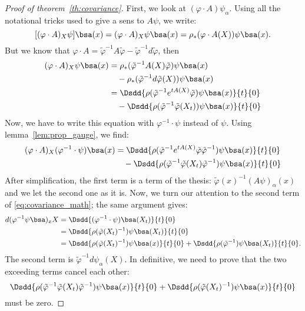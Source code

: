 \begin{proof}[Proof of theorem~\ref{th:covariance}]
	First, we look at $(\varphi\cdot A)\psi_{\alpha}$. Using all the notational tricks used to give a sens to $A\psi$, we write:
	\[
		[(\varphi\cdot A)_X\psi]\bsa(x)=(\varphi\cdot A)_X\psi\bsa(x)=\rho_*(\varphi\cdot A(X))\psi\bsa(x).
	\]
	But we know that $\varphi\cdot A=\tilde{\varphi}^{-1} A\tilde{\varphi}-\tilde{\varphi}^{-1} d\tilde{\varphi}$, then
	\begin{equation}\label{eq:en_deux}
		\begin{split}
			(\varphi\cdot A)_X\psi\bsa(x)
			&=\rho_*(\tilde{\varphi}^{-1} A(X)\tilde{\varphi})\psi\bsa(x)\\
			&\quad-\rho_*(\tilde{\varphi}^{-1} d\tilde{\varphi}(X))\psi\bsa(x)\\
			&=\Dsdd{ \rho(\tilde{\varphi}^{-1} e^{tA(X)}\tilde{\varphi})\psi\bsa(x)}{t}{0}\\
			&\quad-\Dsdd{ \rho(\tilde{\varphi}^{-1}\tilde{\varphi}(X_t))\psi\bsa(x) }{t}{0}
		\end{split}
	\end{equation}
	Now, we have to write this equation with $\varphi^{-1}\cdot\psi$ instead of $\psi$. Using lemma~\ref{lem:prop_gauge}, we find:
	\begin{equation}
		\begin{split}
			(\varphi\cdot A)_X(\varphi^{-1}\cdot\psi)\bsa(x)
			&=\Dsdd{ \rho(\tilde{\varphi}^{-1} e^{tA(X)}\tilde{\varphi}\tilde{\varphi}^{-1})\psi\bsa(x)}{t}{0}\\
			&\quad-\Dsdd{ \rho(\tilde{\varphi}^{-1}\tilde{\varphi}(X_t)\tilde{\varphi}^{-1})\psi\bsa(x) }{t}{0}
		\end{split}
	\end{equation}
	After simplification, the first term is a term of the thesis: $\tilde{\varphi}(x)^{-1}(A\psi)_{\alpha}(x)$ and we let the second one as it is. Now, we turn our attention to the second term of \eqref{eq:covariance_math}; the same argument gives:
	\begin{equation}
		\begin{split}
			d(\varphi^{-1}\psi\bsa)_xX
			&=\Dsdd{(\varphi^{-1}\cdot\psi)\bsa(X_t)}{t}{0}\\
			&=\Dsdd{\rho(\tilde{\varphi}(X_t)^{-1})\psi\bsa(X_t)}{t}{0}\\
			&=\Dsdd{\rho(\tilde{\varphi}(X_t)^{-1})\psi\bsa(x)}{t}{0}
			+\Dsdd{\rho(\tilde{\varphi}^{-1})\psi\bsa(X_t)}{t}{0}.
		\end{split}
	\end{equation}
	The second term is $\tilde{\varphi}^{-1} d\psi_{\alpha}(X)$. In definitive, we need to prove that the two exceeding terms cancel each other:
	\begin{equation}\label{eq:le_zero}
		\Dsdd{\rho(\tilde{\varphi}^{-1}\tilde{\varphi}(X_t)\tilde{\varphi}^{-1})\psi\bsa(x)}{t}{0}
		+\Dsdd{\rho(\tilde{\varphi}(X_t)^{-1})\psi\bsa(x)}{t}{0}
	\end{equation}
	must be zero.


\end{proof}
